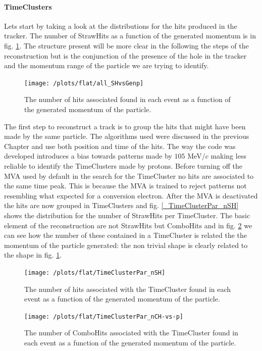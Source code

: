 \documentclass[12pt,a4paper,openright, oneside, titlepage]{book} %
\begin{document}
\paragraph{TimeClusters} 
Lets start by taking a look at the distributions for the hits produced in the tracker. 
The number of StrawHits as a function of the generated momentum is in fig. \ref{_all_SHvsGenp}.
The structure present will be more clear in the following the steps of the reconstruction but is the conjunction of the presence of the hole in the tracker and the momentum range of the particle we are trying to identify.

\begin{figure}[h!]
\centering
\texttt{[image: /plots/flat/all\_SHvsGenp]}
\caption{The number of hits associated found in each event as a function of the generated momentum of the particle.}
\label{_all_SHvsGenp}
\end{figure}

\noindent The first step to reconstruct a track is to group the hits that might have been made by the same particle. 
The algorithms used were discussed in the previous Chapter and use both position and time of the hits. 
The way the code was developed introduces a bias towards patterns made by $105$ MeV$/c$ making less reliable to identify the TimeClusters made by protons. 
Before turning off the MVA used by default in the search for the TimeCluster no hits are associated to the same time peak. 
This is because the MVA is trained to reject patterns not resembling what expected for a conversion electron. 
After the MVA is deactivated the hits are now grouped in TimeClusters and fig. \ref{_TimeClusterPar_nSH} shows the distribution for the number of StrawHits per TimeCluster. 
The basic element of the reconstruction are not StrawHits but ComboHits and in fig. \ref{_flat_TimeClusterMVA_nCH-vs-p} we can see how the number of these contained in a TimeCluster is related the the momentum of the particle generated: the non trivial shape is clearly related to the shape in fig. \ref{_all_SHvsGenp}. \\

\begin{figure}[!htb]
    \centering
    \begin{minipage}{.49\textwidth}
		\centering
\texttt{[image: /plots/flat/TimeClusterPar\_nSH]}
\caption{The number of hits associated with the TimeCluster found in each event as a function of the generated momentum of the particle.}
\label{_TimeClusterPar_nSH}
	\end{minipage}
	\hfill
    \begin{minipage}{0.49\textwidth}
    	\centering
    	\texttt{[image: /plots/flat/TimeClusterPar\_nCH-vs-p]}
\caption{The number of ComboHits associated with the TimeCluster found in each event as a function of the generated momentum of the particle.}
\label{_flat_TimeClusterMVA_nCH-vs-p}
    \end{minipage}
\end{figure}
    	
\end{document}
